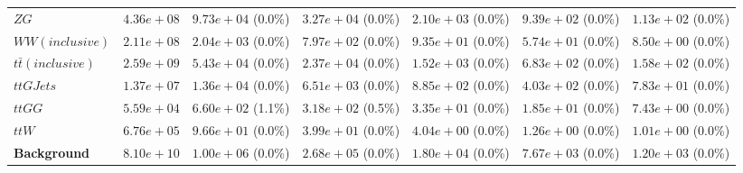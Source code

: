 \begin{landscape}
\begin{table}[h!]
\begin{tabular}{ |l|c|c|c|c|c|c| }
                                      $ZG$ &  $4.36e+08$ &   $9.73e+04$ (0.0\%) &  $3.27e+04$ (0.0\%) &  $2.10e+03$ (0.0\%) &    $9.39e+02$ (0.0\%) &    $1.13e+02$ (0.0\%) \\
                           $WW(inclusive)$ &  $2.11e+08$ &   $2.04e+03$ (0.0\%) &  $7.97e+02$ (0.0\%) &  $9.35e+01$ (0.0\%) &    $5.74e+01$ (0.0\%) &    $8.50e+00$ (0.0\%) \\
                    $t\bar{t} (inclusive)$ &  $2.59e+09$ &   $5.43e+04$ (0.0\%) &  $2.37e+04$ (0.0\%) &  $1.52e+03$ (0.0\%) &    $6.83e+02$ (0.0\%) &    $1.58e+02$ (0.0\%) \\
                                 $ttGJets$ &  $1.37e+07$ &   $1.36e+04$ (0.0\%) &  $6.51e+03$ (0.0\%) &  $8.85e+02$ (0.0\%) &    $4.03e+02$ (0.0\%) &    $7.83e+01$ (0.0\%) \\
                                    $ttGG$ &  $5.59e+04$ &   $6.60e+02$ (1.1\%) &  $3.18e+02$ (0.5\%) &  $3.35e+01$ (0.0\%) &    $1.85e+01$ (0.0\%) &    $7.43e+00$ (0.0\%) \\
                                     $ttW$ &  $6.76e+05$ &   $9.66e+01$ (0.0\%) &  $3.99e+01$ (0.0\%) &  $4.04e+00$ (0.0\%) &    $1.26e+00$ (0.0\%) &    $1.01e+00$ (0.0\%) \\
                       \textbf{Background} &  $8.10e+10$ &   $1.00e+06$ (0.0\%) &  $2.68e+05$ (0.0\%) &  $1.80e+04$ (0.0\%) &    $7.67e+03$ (0.0\%) &    $1.20e+03$ (0.0\%) \\
    \hline
\end{tabular}
\label{semileptonic_cutflow}
\end{table}
\end{landscape}



